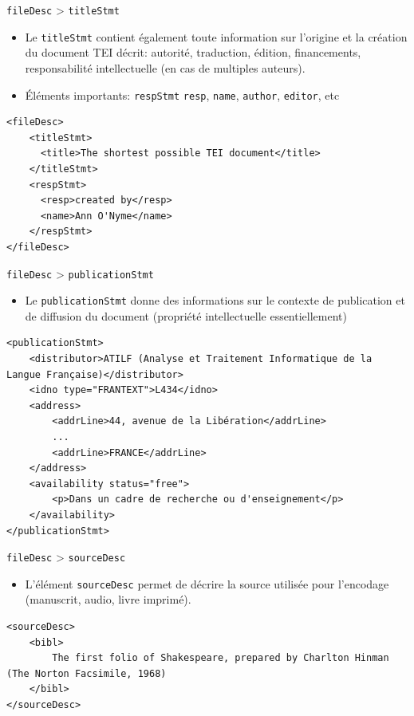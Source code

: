 \documentclass[11pt,aspectratio=1610]{beamer}
\begin{document}
\begin{frame}[containsverbatim]{\texttt{fileDesc} > \texttt{titleStmt}}
\begin{itemize}
\item Le \texttt{titleStmt} contient également toute information sur l'origine et la création du document TEI décrit: autorité, traduction, édition, financements, responsabilité intellectuelle (en cas de multiples auteurs).
\item Éléments importants: \texttt{respStmt} \texttt{resp}, \texttt{name}, \texttt{author}, \texttt{editor}, etc 
\end{itemize}
\begin{verbatim}
<fileDesc>
    <titleStmt>
      <title>The shortest possible TEI document</title>
    </titleStmt>
    <respStmt>
      <resp>created by</resp>
      <name>Ann O'Nyme</name>
    </respStmt>
</fileDesc>
\end{verbatim}
\end{frame}

\begin{frame}[containsverbatim]{\texttt{fileDesc} > \texttt{publicationStmt}}
\begin{itemize}
\item Le \texttt{publicationStmt} donne des informations sur le contexte de publication et de diffusion du document (propriété intellectuelle essentiellement)
\end{itemize}
\begin{verbatim}
<publicationStmt>
    <distributor>ATILF (Analyse et Traitement Informatique de la Langue Française)</distributor>
    <idno type="FRANTEXT">L434</idno>
    <address>
        <addrLine>44, avenue de la Libération</addrLine>
        ...
        <addrLine>FRANCE</addrLine>
    </address>
    <availability status="free">
        <p>Dans un cadre de recherche ou d'enseignement</p>
    </availability>
</publicationStmt>
\end{verbatim}
\end{frame}


\begin{frame}[containsverbatim]{\texttt{fileDesc} > \texttt{sourceDesc}}
\begin{itemize}
\item L'élément \texttt{sourceDesc} permet de décrire la source utilisée pour l'encodage (manuscrit, audio, livre imprimé). 
\end{itemize}
\begin{verbatim}
<sourceDesc>
    <bibl>
        The first folio of Shakespeare, prepared by Charlton Hinman (The Norton Facsimile, 1968)
    </bibl>
</sourceDesc>
\end{verbatim}
\end{frame}
\end{document}
